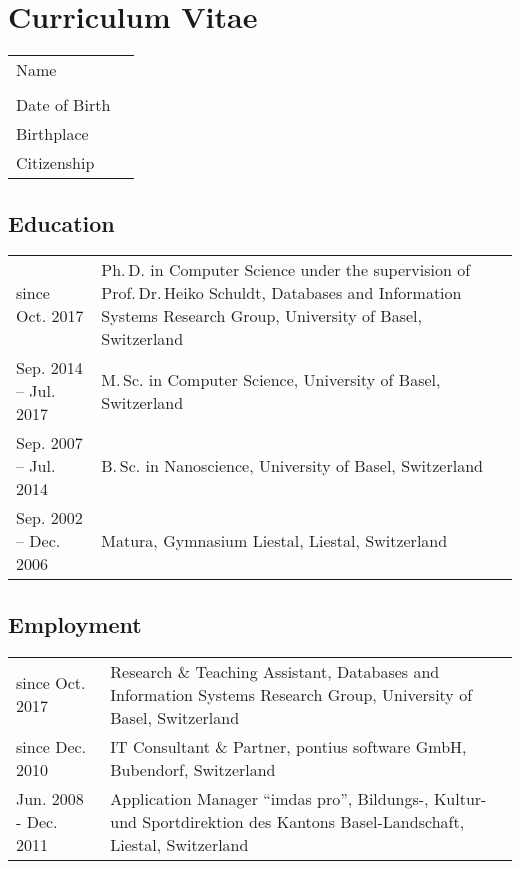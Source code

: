 
\chapter*{Curriculum Vitae}


\begin{tabularx}{\textwidth}{>{\raggedleft}p{}X}
	Name  & \thesisauthor \\
	& \thesisauthoraddress \\
	Date of Birth & \thesisauthordateofbirth \\
	Birthplace & \thesisauthorbirthplace \\
	Citizenship & \thesisauthornationalityCv \\
\end{tabularx}

\section*{Education}
\begin{tabularx}{\textwidth}{>{\raggedleft}p{}X}
	since Oct. 2017  & Ph.\,D. in Computer Science under the supervision of Prof.\,Dr.\,Heiko Schuldt, Databases and Information Systems Research Group, University of Basel, Switzerland \\
	\rule{0pt}{3ex}%
	Sep. 2014 -- Jul. 2017  & M.\,Sc. in Computer Science, University of Basel, Switzerland \\
	\rule{0pt}{3ex}%
	Sep. 2007 -- Jul. 2014  & B.\,Sc. in Nanoscience, University of Basel, Switzerland \\
	\rule{0pt}{3ex}%
	Sep. 2002 -- Dec. 2006  & Matura, Gymnasium Liestal, Liestal, Switzerland \\
\end{tabularx}

\section*{Employment}
\begin{tabularx}{\textwidth}{>{\raggedleft}p{}X}
	since Oct. 2017  & Research \& Teaching Assistant, Databases and Information Systems Research Group, University of Basel, Switzerland \\
	since Dec. 2010  & IT Consultant \& Partner, pontius software GmbH, Bubendorf, Switzerland \\
	Jun. 2008 - Dec. 2011  & Application Manager ``imdas pro'', Bildungs-, Kultur- und Sportdirektion des Kantons Basel-Landschaft, Liestal, Switzerland
\end{tabularx}

